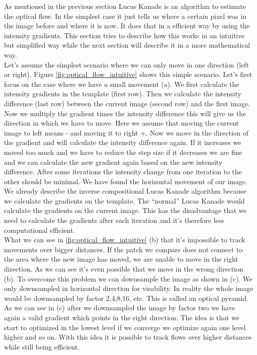\documentclass[11pt,a4paper,titlepage,oneside]{report}
\begin{document}
As mentioned in the previous section Lucas Kanade is an algorithm to estimate the optical flow. In the simplest case it just tells us where a certain pixel was in the image before and where it is now. It does that in a efficient way by using the intensity gradients. This section tries to describe how this works in an intuitive but simplified way while the next section will describe it in a more mathematical way.\\
Let's assume the simplest scenario where we can only move in one direction (left or right). Figure \ref{fig:optical_flow_intuitive} shows this simple scenario. Let's first focus on the case where we have a small movement (a). We first calculate the intensity gradients in the template (first row). Then we calculate the intensity difference (last row) between the current image (second row) and the first image. Now we multiply the gradient times the intensity difference this will give us the direction in which we have to move. Here we assume that moving the current image to left means - and moving it to right +. Now we move in the direction of the gradient and will calculate the intensity difference again. If it increases we moved too much and we have to reduce the step size if it decreases we are fine and we can calculate the new gradient again based on the new intensity difference. After some iterations the intensity change from one iteration to the other should be minimal. We have found the horizontal movement of our image. We already describe the inverse compositional Lucas Kanade algorithm because we calculate the gradients on the template. The ``normal'' Lucas Kanade would calculate the gradients on the current image. This has the disadvantage that we need to calculate the gradients after each iteration and it's therefore less computational efficient.\\
What we can see in \ref{fig:optical_flow_intuitive} (b) that it's impossible to track movements over bigger distances. If the patch we compare does not connect to the area where the new image has moved, we are unable to move in the right direction. As we can see it's even possible that we move in the wrong direction (b). To overcome this problem we can downsample the image as shown in (c). We only downsampled in horizontal direction for visability. In reality the whole image would be downsampled by factor 2,4,8,16, etc. This is called an optical pyramid. As we can see in (c) after we downsampled the image by factor two we have again a valid gradient which points in the right direction. The idea is that we start to optimized in the lowest level if we converge we optimize again one level higher and so on. With this idea it is possible to track flows over higher distances while still being efficient.
\end{document}

